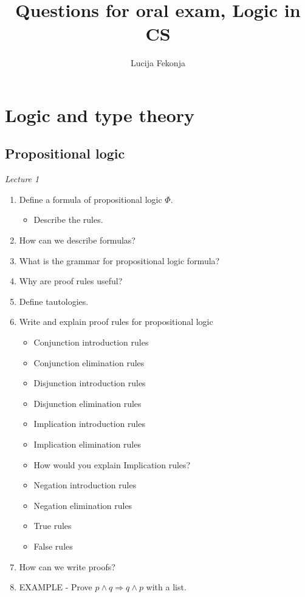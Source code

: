 \documentclass[fleqn]{article}
\title{Questions for oral exam, Logic in CS}
\author{Lucija Fekonja}
\begin{document}
\maketitle

\section{Logic and type theory}

\subsection{Propositional logic}
\textit{Lecture 1}
\begin{enumerate}
    \item Define a formula of propositional logic $\Phi$.
    \begin{itemize}
        \item Describe the rules.
    \end{itemize}
    \item How can we describe formulas?
    \item What is the grammar for propositional logic formula?
    \item Why are proof rules useful?
    \item Define tautologies.
    \item Write and explain proof rules for propositional logic
    \begin{itemize}
        \item Conjunction introduction rules
        \item Conjunction elimination rules
        \item Disjunction introduction rules
        \item Disjunction elimination rules
        \item Implication introduction rules
        \item Implication elimination rules
        \item How would you explain Implication rules?
        \item Negation introduction rules
        \item Negation elimination rules
        \item True rules
        \item False rules
    \end{itemize}
    \item How can we write proofs?
    \item EXAMPLE \-- Prove $p \wedge q \Rightarrow q \wedge p$ with a list.

\end{enumerate}
\end{document}
